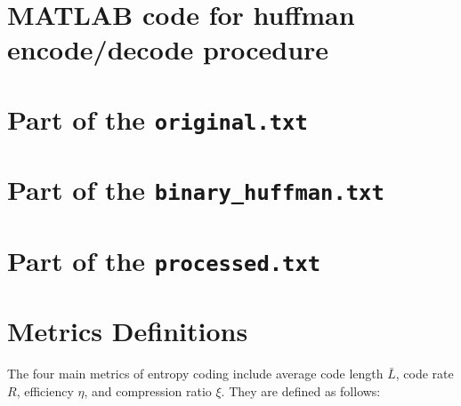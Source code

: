 \documentclass[12pt,twoside]{article}
\begin{document}
\begin{appendices}

\newpage
\section{MATLAB code for huffman encode/decode procedure}
\label{app:fano}




\newpage
\section{Part of the \texttt{original.txt}}
\label{lst:originalpart}


\section{Part of the \texttt{binary\_huffman.txt}}
\label{lst:binaryhuffmanpart}


\section{Part of the \texttt{processed.txt}}
\label{lst:processedpart}


\newpage
\section{Metrics Definitions}
\label{app:metrics}

The four main metrics of entropy coding include average code length $\bar{L}$, code rate $R$, efficiency $\eta$, and compression ratio $\xi$. They are defined as follows:


\end{appendices}
\end{document}
